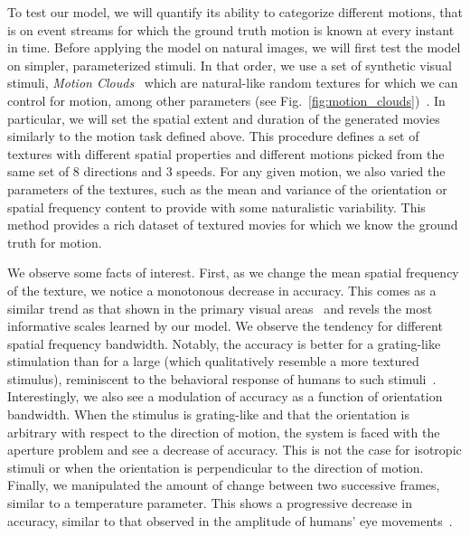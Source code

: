 \documentclass[default]{sn-jnl}%
\theoremstyle{thmstyleone}%
\theoremstyle{thmstyletwo}%
\theoremstyle{thmstylethree}%
\newcommand{\seeFig}[1]{see Fig.~\ref{fig:#1}}%
\begin{document}
To test our model, we will quantify its ability to categorize different motions, that is on event streams for which the ground truth motion is known at every instant in time. Before applying the model on natural images, we will first test the model on simpler, parameterized stimuli. In that order, we use a set of synthetic visual stimuli, \textit{Motion Clouds}~\citep{leon_motion_2012} which are natural-like random textures for which we can control for motion, among other parameters (\seeFig{motion_clouds})~\citep{vacher_bayesian_2018}. In particular, we will set the spatial extent and duration of the generated movies similarly to the motion task defined above. This procedure defines a set of textures with different spatial properties and different motions picked from the same set of $8$ directions and $3$ speeds. For any given motion, we also varied the parameters of the textures, such as the mean and variance of the orientation or spatial frequency content to provide with some naturalistic variability. This method provides a rich dataset of textured movies for which we know the ground truth for motion.

We observe some facts of interest. First, as we change the mean spatial frequency of the texture, we notice a monotonous decrease in accuracy. This comes as a similar trend as that shown in the primary visual areas~\citep{priebe_tuning_2006} and revels the most informative scales learned by our model. We observe the tendency for different spatial frequency bandwidth. Notably, the accuracy is better for a grating-like stimulation than for a large (which qualitatively resemble a more textured stimulus), reminiscent to the behavioral response of humans to such stimuli~\citep{simoncini_more_2012, ravello_speed-selectivity_2019}. Interestingly, we also see a modulation of accuracy as a function of orientation bandwidth. When the stimulus is grating-like and that the orientation is arbitrary with respect to the direction of motion, the system is faced with the aperture problem and see a decrease of accuracy. This is not the case for isotropic stimuli or when the orientation is perpendicular to the direction of motion. Finally, we manipulated the amount of change between two successive frames, similar to a temperature parameter. This shows a progressive decrease in accuracy, similar to that observed in the amplitude of humans' eye movements~\citep{mansour_pour_speed_2018}. %
%
\end{document}
